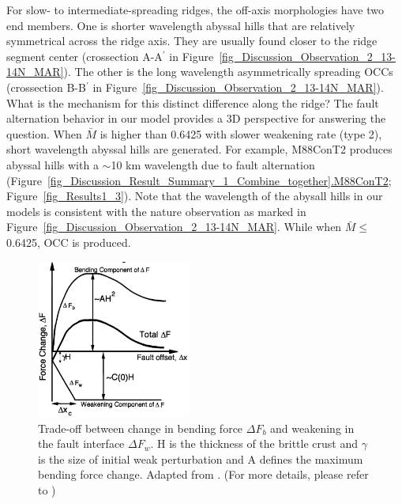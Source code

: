 For slow- to intermediate-spreading ridges, the off-axis morphologies have two end members. One is shorter wavelength abyssal hills that are relatively symmetrical across the ridge axis. They are usually found closer to the ridge segment center (crossection A-A$^{\prime}$ in Figure~\hyperref[fig_Discussion_Observation_2_13-14N_MAR]{\ref{fig_Discussion_Observation_2_13-14N_MAR}}). The other is the long wavelength asymmetrically spreading OCCs (crossection B-B$^{\prime}$ in Figure~\hyperref[fig_Discussion_Observation_2_13-14N_MAR]{\ref{fig_Discussion_Observation_2_13-14N_MAR}}). What is the mechanism for this distinct difference along the ridge? The fault alternation behavior in our model provides a 3D perspective for answering the question. When $\bar{M}$ is higher than 0.6425 with slower weakening rate (type 2), short wavelength abyssal hills are generated. For example, M88ConT2 produces abyssal hills with a $\sim$10 km wavelength due to fault alternation (Figure~\hyperref[fig_Discussion_Result_Summary_1_Combine_together]{\ref{fig_Discussion_Result_Summary_1_Combine_together}.M88ConT2}; Figure~\hyperref[fig_Results1_3]{\ref{fig_Results1_3}}). Note that the wavelength of the abysall hills in our models is consistent with the nature observation as marked in Figure~\hyperref[fig_Discussion_Observation_2_13-14N_MAR]{\ref{fig_Discussion_Observation_2_13-14N_MAR}}. While when $\bar{M} \le$ 0.6425, OCC is produced.

\begin{figure}[h]
 \centering
  \includegraphics[width=0.45\textwidth]{./Figures/fig_Results_Weakening_1_tradeOff_bend_weak.png}
 \caption[Trade-off between change in bending force $\Delta F_{b}$ and weakening in the fault interface $\Delta F_{w}$. Adapted from \citep{Lavier2000}.]{Trade-off between change in bending force $\Delta F_{b}$ and weakening in the fault interface $\Delta F_{w}$. H is the thickness of the brittle crust and $\gamma$ is the size of initial weak perturbation and A defines the maximum bending force change. Adapted from \citep{Lavier2000}. (For more details, please refer to \citep{Lavier2000})}
 \label{fig_Results_Weakening_1}
\end{figure}

